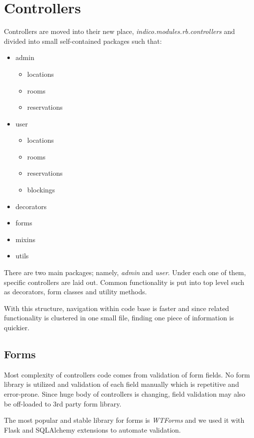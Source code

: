\section{Controllers}

Controllers are moved into their new place, \textit{indico.modules.rb.controllers} and divided into small self-contained packages such that:
\begin{itemize}
  \item admin
    \begin{itemize}
      \item locations
      \item rooms
      \item reservations
    \end{itemize}
  \item user
    \begin{itemize}
      \item locations
      \item rooms
      \item reservations
      \item blockings
    \end{itemize}
  \item decorators
  \item forms
  \item mixins
  \item utils
\end{itemize}

There are two main packages; namely, \textit{admin} and \textit{user}. Under each one of them, specific controllers are laid out. Common functionality is put into top level such as decorators, form classes and utility methods.

With this structure, navigation within code base is faster and since related functionality is clustered in one small file, finding one piece of information is quickier.

\subsection{Forms}

Most complexity of controllers code comes from validation of form fields. No form library is utilized and validation of each field manually which is repetitive and error-prone. Since huge body of controllers is changing, field validation may also be off-loaded to 3rd party form library.

The most popular and stable library for forms is \textit{WTForms} and we used it with Flask and SQLAlchemy extensions to automate validation.

